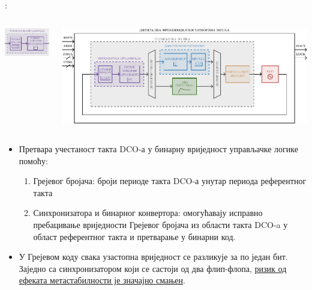 \documentclass[aspectratio=169]{beamer}
\def \CtrlPreprocColor {RoyalPurple}
\def \DCO  {DCO} %
\begin{document}
\begin{frame}{\secname: \subsecname}
	\vspace{-0.5cm}
	\begin{columns}[t]
        \begin{column}{0.25\linewidth}
        	\begin{center}
        		\vspace{-0.2cm}
	            \includegraphics[scale=1.3]{slike/prezentacija/CTRL_PREPROC.pdf} 
	        \end{center}
        \end{column}
        \begin{column}{0.75\linewidth}
        	\begin{center}
			\vspace{-0.3cm}
            	\includegraphics[scale=0.5]{slike/prezentacija/FLL.pdf}
            \end{center}
        \end{column}
    \end{columns}
    \medskip
	\begin{itemize}
		\item Претвара учестаност такта \DCO-а у бинарну вриједност управљачке логике помоћу:
		\begin{enumerate}
			\color{\CtrlPreprocColor}
			\item Грејевог бројача: броји периоде такта \DCO-а унутар периода референтног такта
			\item Синхронизатора и бинарног конвертора: омогућавају исправно пребацивање вриједности Грејевог бројача из области такта \DCO-a у област референтног такта и претварање у бинарни код.
		\end{enumerate}
		\smallskip
	\item У Грејевом коду свака узастопна вриједност се разликује за по један бит. Заједно са синхронизатором који се састоји од два флип-флопа, \underline{ризик од ефеката метастабилности је значајно смањен}.
	\end{itemize}
\end{frame}
\end{document}

